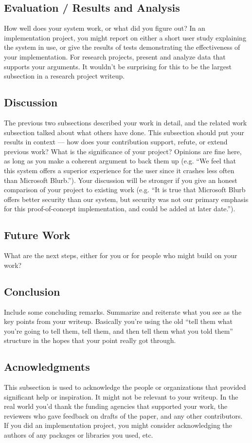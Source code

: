 \documentclass[sigconf,nonacm]{acmart}
\begin{document}
\subsection{Evaluation / Results and Analysis}
How well does your system work, or what did you figure out? In an implementation project, you might report on either a short user study explaining the system in use, or give the results of tests demonstrating the effectiveness of your implementation. For research projects, present and analyze data that supports your arguments. It wouldn’t be surprising for this to be the largest subsection in a research project writeup.

\subsection{Discussion}
The previous two subsections described your work in detail, and the related work subsection talked about what others have done. This subsection should put your results in context — how does your contribution support, refute, or extend previous work? What is the significance of your project? Opinions are fine here, as long as you make a coherent argument to back them up (e.g. “We feel that this system offers a superior experience for the user since it crashes less often than Microsoft Blurb.”). Your discussion will be stronger if you give an honest comparison of your project to existing work (e.g. “It is true that Microsoft Blurb offers better security than our system, but security was not our primary emphasis for this proof-of-concept implementation, and could be added at later date.”).

\subsection{Future Work}
What are the next steps, either for you or for people who might build on your work?

\subsection{Conclusion}
Include some concluding remarks. Summarize and reiterate what you see as the key points from your writeup. Basically you’re using the old “tell them what you’re going to tell them, tell them, and then tell them what you told them” structure in the hopes that your point really got through.

\subsection{Acnowledgments}
This subsection is used to acknowledge the people or organizations that provided significant help or inspiration. It might not be relevant to your writeup. In the real world you’d thank the funding agencies that supported your work, the reviewers who gave feedback on drafts of the paper, and any other contributors. If you did an implementation project, you might consider acknowledging the authors of any packages or libraries you used, etc.
\end{document}
